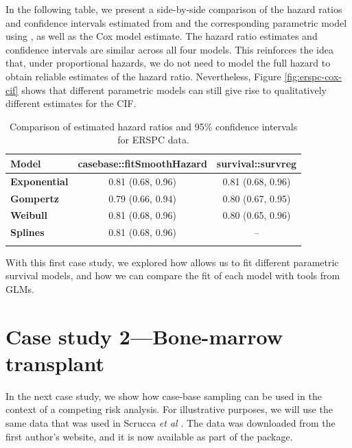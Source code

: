 \documentclass[
]{jss}
\begin{document}
In the following table, we present a side-by-side comparison of the
hazard ratios and confidence intervals estimated from
 and the corresponding parametric model using
, as well as the Cox model estimate. The hazard
ratio estimates and confidence intervals are similar across all four
models. This reinforces the idea that, under proportional hazards, we do
not need to model the full hazard to obtain reliable estimates of the
hazard ratio. Nevertheless, Figure \ref{fig:erspc-cox-cif} shows that
different parametric models can still give rise to qualitatively
different estimates for the CIF.

\begin{CodeChunk}
\begin{table}

\caption{\label{tab:print-erspc-estimates}Comparison of estimated hazard ratios and 95\% confidence intervals for ERSPC data.}
\centering
\begin{tabular}[t]{>{\bfseries}lcc}
\toprule
Model & casebase::fitSmoothHazard & survival::survreg\\
\midrule
Exponential & 0.81 (0.68, 0.96) & 0.81 (0.68, 0.96)\\
\cmidrule{1-3}
Gompertz & 0.79 (0.66, 0.94) & 0.80 (0.67, 0.95)\\
\cmidrule{1-3}
Weibull & 0.81 (0.68, 0.96) & 0.80 (0.65, 0.96)\\
\cmidrule{1-3}
Splines & 0.81 (0.68, 0.96) & --\\
\bottomrule
\multicolumn{3}{l}{Cox model estimate: HR (95\% CI) = 0.80 (0.67, 0.95)}\\
\end{tabular}
\end{table}

\end{CodeChunk}

With this first case study, we explored how  allows us to
fit different parametric survival models, and how we can compare the fit
of each model with tools from GLMs.

\hypertarget{case-study-2bone-marrow-transplant}{%
\section{Case study 2---Bone-marrow
transplant}\label{case-study-2bone-marrow-transplant}}

In the next case study, we show how case-base sampling can be used in
the context of a competing risk analysis. For illustrative purposes, we
will use the same data that was used in Scrucca \emph{et al}
\citeyearpar{scrucca2010regression}. The data was downloaded from the
first author's website, and it is now available as part of the
 package.
\end{document}
